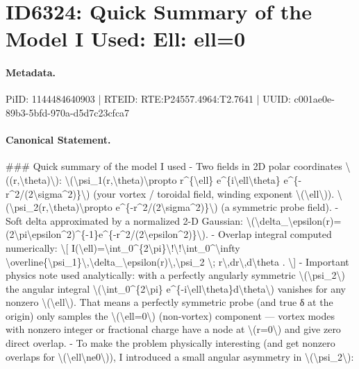 \section*{ID6324: Quick Summary of the Model I Used: Ell: ell=0}
\paragraph{Metadata.}
PiID: 1144484640903 | RTEID: RTE:P24557.4964:T2.7641 | UUID: c001ae0e-89b3-5bfd-970a-d5d7c23cfca7

\paragraph{Canonical Statement.}
\#\#\# Quick summary of the model I used - Two fields in 2D polar coordinates \textbackslash{}((r,\textbackslash{}theta)\textbackslash{}): \textbackslash{}(\textbackslash{}psi\_1(r,\textbackslash{}theta)\textbackslash{}propto r\textasciicircum{}\{\textbackslash{}ell\} e\textasciicircum{}\{i\textbackslash{}ell\textbackslash{}theta\} e\textasciicircum{}\{-r\textasciicircum{}2/(2\textbackslash{}sigma\textasciicircum{}2)\}\textbackslash{}) (your vortex / toroidal field, winding exponent \textbackslash{}(\textbackslash{}ell\textbackslash{})). \textbackslash{}(\textbackslash{}psi\_2(r,\textbackslash{}theta)\textbackslash{}propto e\textasciicircum{}\{-r\textasciicircum{}2/(2\textbackslash{}sigma\textasciicircum{}2)\}\textbackslash{}) (a symmetric probe field). - Soft delta approximated by a normalized 2-D Gaussian: \textbackslash{}(\textbackslash{}delta\_\textbackslash{}epsilon(r)=(2\textbackslash{}pi\textbackslash{}epsilon\textasciicircum{}2)\textasciicircum{}\{-1\}e\textasciicircum{}\{-r\textasciicircum{}2/(2\textbackslash{}epsilon\textasciicircum{}2)\}\textbackslash{}). - Overlap integral computed numerically: \textbackslash{}[ I(\textbackslash{}ell)=\textbackslash{}int\_0\textasciicircum{}\{2\textbackslash{}pi\}\textbackslash{}!\textbackslash{}!\textbackslash{}int\_0\textasciicircum{}\textbackslash{}infty \textbackslash{}overline\{\textbackslash{}psi\_1\}\textbackslash{},\textbackslash{}delta\_\textbackslash{}epsilon(r)\textbackslash{},\textbackslash{}psi\_2 \textbackslash{}; r\textbackslash{},dr\textbackslash{},d\textbackslash{}theta . \textbackslash{}] - Important physics note used analytically: with a perfectly angularly symmetric \textbackslash{}(\textbackslash{}psi\_2\textbackslash{}) the angular integral \textbackslash{}(\textbackslash{}int\_0\textasciicircum{}\{2\textbackslash{}pi\} e\textasciicircum{}\{-i\textbackslash{}ell\textbackslash{}theta\}d\textbackslash{}theta\textbackslash{}) vanishes for any nonzero \textbackslash{}(\textbackslash{}ell\textbackslash{}). That means a perfectly symmetric probe (and true δ at the origin) only samples the \textbackslash{}(\textbackslash{}ell=0\textbackslash{}) (non-vortex) component — vortex modes with nonzero integer or fractional charge have a node at \textbackslash{}(r=0\textbackslash{}) and give zero direct overlap. - To make the problem physically interesting (and get nonzero overlaps for \textbackslash{}(\textbackslash{}ell\textbackslash{}ne0\textbackslash{})), I introduced a small angular asymmetry in \textbackslash{}(\textbackslash{}psi\_2\textbackslash{}): 